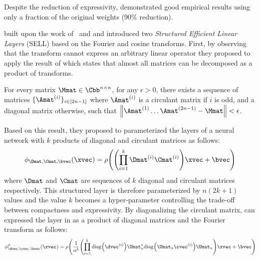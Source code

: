 Despite the reduction of expressivity, \citet{cheng2015exploration} demonstrated good empirical results using only a fraction of the original weights (90\% reduction). 


\citet{moczulski2016acdc} built upon the work of~\citet{cheng2015exploration} and \citet{huhtanen2015factoring} and introduced two \emph{Structured Efficient Linear Layers} (SELL) based on the Fourier and cosine transforms.
First, by observing that the \DC transform cannot express an arbitrary linear operator they proposed to apply the result of \citet{huhtanen2015factoring} which states that almost all matrices can be decomposed as a product of \DC transforms.
\begin{theorem} \label{theorem:ch3-huhtanen}
  For every matrix $\Mmat \in \Cnn$, for any $\epsilon > 0$, there exists a sequence of matrices $\{ \Amat^{(i)} \}_{i \in [2n-1]}$ where $\Amat^{(i)}$ is a circulant matrix if $i$ is odd, and a diagonal matrix otherwise, such that $\norm{\Amat^{(1)} \ldots \Amat^{(2n-1)} - \Mmat} < \epsilon$.
\end{theorem}
\noindent
Based on this result, they proposed to parameterized the layers of a neural network with $k$ products of diagonal and circulant matrices as follows:
\begin{equation} \label{equation:acdc_layer}
  \layer_{\Dmat, \Cmat, \bvec} (\xvec) = \act \left( \left(\prod_{i = 1}^{k} \Dmat^{(i)} \Cmat^{(i)} \right) \xvec + \bvec \right)
\end{equation}
where $\Dmat$ and $\Cmat$ are sequences of $k$ diagonal and circulant matrices respectively.
This structured layer is therefore parameterized by $n(2k+1)$ values and the value $k$ becomes a hyper-parameter controlling the trade-off between compactness and expressivity. 
By diagonalizing the circulant matrix, \citet{moczulski2016acdc} can expressed the layer in  as a product of diagonal matrices and the Fourier transform as follows:
\begin{equation} \label{equation:ch3-laye_acdc}
  \layer^\act_{\dvec, \cvec, \bvec} (\xvec) = \act \left(\frac{1}{n^k} \left(\prod_{i = 1}^{k} \diag\left(\dvec^{(i)}\right) \Umat_n^* \diag\left(\Umat_n \cvec^{(i)}\right) \Umat_n \right) \xvec + \bvec \right)
\end{equation}
